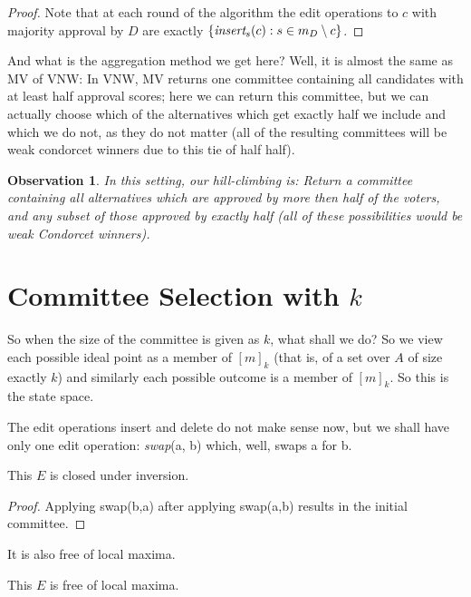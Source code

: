 \documentclass[sigconf]{aamas}  %
\newtheorem{observation}{Observation}
\newcommand{\iinsert}[1]{\emph{insert}_{#1}}
\begin{document}
\begin{proof}
Note that at each round of the algorithm the edit operations to $c$ with majority approval by $D$ are exactly $\{\iinsert{s}(c) : s \in m_D \setminus c\}$.
\end{proof}

And what is the aggregation method we get here?
Well, it is almost the same as MV of VNW:
  In VNW, MV returns one committee containing all candidates with at least half approval scores; here we can return this committee, but we can actually choose which of the alternatives which get exactly half we include and which we do not, as they do not matter (all of the resulting committees will be weak condorcet winners due to this tie of half half).
  
\begin{observation}
  In this setting, our hill-climbing is:
    Return a committee containing all alternatives which are approved by more then half of the voters, and any subset of those approved by exactly half
    (all of these possibilities would be weak Condorcet winners).
\end{observation}


\section{Committee Selection with $k$}

So when the size of the committee is given as $k$, what shall we do?
So we view each possible ideal point as a member of $[m]_k$ (that is, of a set over $A$ of size exactly $k$) and similarly each possible outcome is a member of $[m]_k$.
So this is the state space.

The edit operations insert and delete do not make sense now, but we shall have only one edit operation: \emph{swap}(a, b) which, well, swaps a for b.

\begin{lemma}
  This $E$ is closed under inversion.
\end{lemma}

\begin{proof}
Applying swap(b,a) after applying swap(a,b) results in the initial committee.
\end{proof}

It is also free of local maxima.

\begin{lemma}
  This $E$ is free of local maxima.
\end{lemma}
\end{document}
